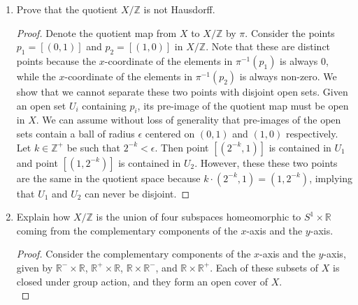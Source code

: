 \documentclass{article}
\begin{document}
\begin{enumerate}
\begin{enumerate}
      \item Prove that the quotient $X/\mathbb{Z}$ is not Hausdorff.
        \begin{proof}
          Denote the quotient map from $X$ to $X/\mathbb{Z}$ by $\pi$.
          Consider the points $p_1=[(0,1)]$ and $p_2=[(1,0)]$ in
          $X/\mathbb{Z}$. Note that these are distinct points because the
          $x$-coordinate of the elements in $\pi^{-1}(p_1)$ is always 0,
          while the $x$-coordinate of the elements in $\pi^{-1}(p_2)$ is
          always non-zero. We show that we cannot separate these two points
          with disjoint open sets. Given an open set $U_i$ containing
          $p_i$, its pre-image of the quotient map must be open in $X$. We
          can assume without loss of generality that pre-images of the open
          sets contain a ball of radius $\epsilon$ centered on $(0,1)$ and
          $(1,0)$ respectively. Let $k\in\mathbb{Z}^+$ be such that
          $2^{-k}<\epsilon$. Then point $[(2^{-k},1)]$ is contained in
          $U_1$ and point $[(1,2^{-k})]$ is contained in $U_2$.
          However, these these two points are the same in the quotient
          space because $k\cdot(2^{-k},1)=(1,2^{-k})$, implying that $U_1$
          and $U_2$ can never be disjoint.
        \end{proof}

      \item Explain how $X/\mathbb{Z}$ is the union of four subspaces
        homeomorphic to $S^1\times\mathbb{R}$ coming from the complementary
        components of the $x$-axis and the $y$-axis.

        \begin{proof}
          Consider the complementary components of the $x$-axis and the
          $y$-axis, given by $\mathbb{R}^-\times\mathbb{R}$,
          $\mathbb{R}^+\times\mathbb{R}$, $\mathbb{R}\times\mathbb{R}^-$,
          and $\mathbb{R}\times\mathbb{R}^+$. Each of these subsets of $X$
          is closed under group action, and they form an open cover of $X$.
          \\


\end{proof}
\end{enumerate}
\end{enumerate}
\end{document}
